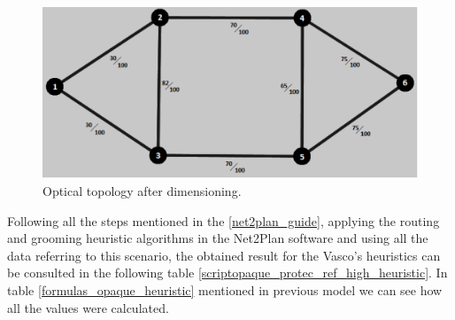 \begin{figure}[H]
\centering
\includegraphics[width=13cm]{sdf/heuristic/opaque_protection/figures/optical_topology_high}
\caption{Optical topology after dimensioning.}
\label{optical_topology_protec_ref_high_heuristic}
\end{figure}

Following all the steps mentioned in the \ref{net2plan_guide}, applying the routing and grooming heuristic algorithms in the Net2Plan software and using all the data referring to this scenario, the obtained result for the Vasco's heuristics can be consulted in the following table \ref{scriptopaque_protec_ref_high_heuristic}. In table \ref{formulas_opaque_heuristic} mentioned in previous model we can see how all the values were calculated. \\

